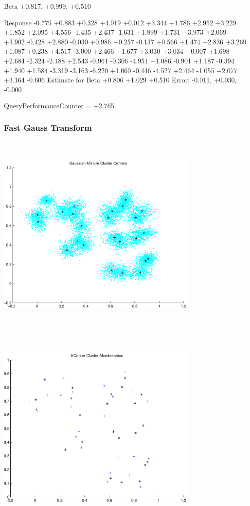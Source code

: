 \documentclass[9pt]{article}
\theoremstyle{plain}
\theoremstyle{definition}
\theoremstyle{remark}
\numberwithin{equation}{section}
\begin{document}
Beta
+0.817, +0.999, +0.510

Response
-0.779
+0.883
+0.328
+4.919
+0.012
+3.344
+1.786
+2.952
+3.229
+1.852
+2.095
+4.556
-1.435
+2.437
-1.631
+1.899
+1.731
+3.973
+2.069
+3.902
-0.428
+2.880
-0.030
+0.986
+0.257
-0.137
+0.566
+1.474
+2.836
+3.269
+1.087
+0.238
+4.517
-3.000
+2.466
+1.677
+3.030
+3.034
+0.007
+1.698
+2.684
-2.324
-2.188
+2.543
-0.961
-0.306
-4.951
+1.086
-0.901
+1.187
-0.394
+1.940
+1.584
-3.319
-3.163
-6.220
+1.060
-0.446
-4.527
+2.464
-1.055
+2.077
+3.164
-0.606
Estimate for Beta
+0.806
+1.029
+0.510
Error:
-0.011, +0.030, -0.000


QueryPerformanceCounter  =  +2.765
\subsubsection{Fast Gauss Transform}
\includegraphics[width=10.0cm,height=10.0cm]{GaussianMixture_ClusterCenters25_Centers.pdf}

\includegraphics[width=10.0cm,height=10.0cm]{KCenterClusterMemberships_25_Centers.pdf}
\end{document}
